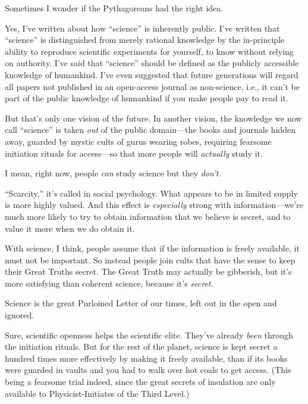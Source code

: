 \myendsectiontext


\bigskip


{
 Sometimes I wonder if the Pythagoreans had the right idea. }

{
 Yes, I've written about how
``science'' is inherently public.
I've written that
``science'' is distinguished from
merely rational knowledge by the in-principle ability to reproduce
scientific experiments for yourself, to know without relying on
authority. I've said that
``science'' should be defined as the
publicly accessible knowledge of humankind. I've even
suggested that future generations will regard all papers not published
in an open-access journal as non-science, i.e., it
can't be part of the public knowledge of humankind if
you make people pay to read it.}

{
 But that's only one vision of the future. In
another vision, the knowledge we now call
``science'' is taken \textit{out} of
the public domain---the books and journals hidden away, guarded by
mystic cults of gurus wearing robes, requiring fearsome initiation
rituals for access---so that more people will \textit{actually} study
it.}

{
 I mean, right now, people \textit{can} study science but they
\textit{don't.}}

{
 ``Scarcity,''
it's called in social psychology. What appears to be in
limited supply is more highly valued. And this effect is
\textit{especially} strong with information---we're
much more likely to try to obtain information that we believe is
secret, and to value it more when we do obtain it.}

{
 With science, I think, people assume that if the information is
freely available, it must not be important. So instead people join
cults that have the sense to keep their Great Truths secret. The Great
Truth may actually be gibberish, but it's more
satisfying than coherent science, because it's
\textit{secret.}}

{
 Science is the great Purloined Letter of our times, left out in
the open and ignored.}

{
 Sure, scientific openness helps the scientific elite.
They've already \textit{been} through the initiation
rituals. But for the rest of the planet, science is kept secret a
hundred times more effectively by making it freely available, than if
its books were guarded in vaults and you had to walk over hot coals to
get access. (This being a fearsome trial indeed, since the great
secrets of insulation are only available to Physicist-Initiates of the
Third Level.)}

